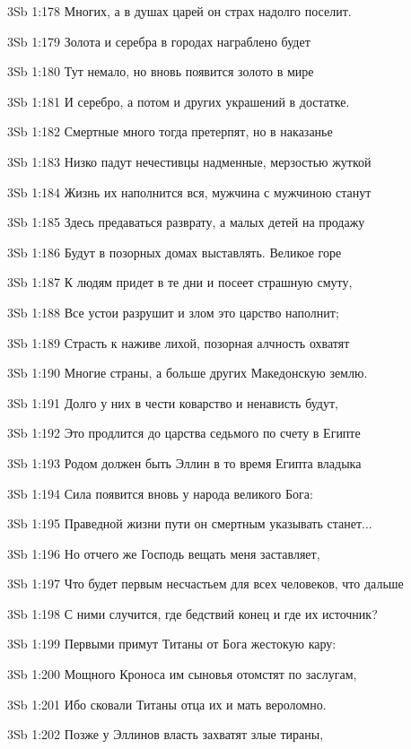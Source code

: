\vs 3Sb 1:178 Многих, а в душах царей он страх надолго поселит. 

\vs 3Sb 1:179 Золота и серебра в городах награблено будет

\vs 3Sb 1:180 Тут немало, но вновь появится золото в мире

\vs 3Sb 1:181 И серебро, а потом и других украшений в достатке. 

\vs 3Sb 1:182 Смертные много тогда претерпят, но в наказанье

\vs 3Sb 1:183 Низко падут нечестивцы надменные, мерзостью жуткой 

\vs 3Sb 1:184 Жизнь их наполнится вся, мужчина с мужчиною станут

\vs 3Sb 1:185 Здесь предаваться разврату, а малых детей на продажу 

\vs 3Sb 1:186 Будут в позорных домах выставлять. Великое горе 

\vs 3Sb 1:187 К людям придет в те дни и посеет страшную смуту, 

\vs 3Sb 1:188 Все устои разрушит и злом это царство наполнит; 

\vs 3Sb 1:189 Страсть к наживе лихой, позорная алчность охватят

\vs 3Sb 1:190 Многие страны, а больше других  Македонскую землю. 

\vs 3Sb 1:191 Долго у них в чести коварство и ненависть будут, 

\vs 3Sb 1:192 Это продлится до царства седьмого по счету в Египте  

\vs 3Sb 1:193 Родом должен быть Эллин в то время Египта владыка  

\vs 3Sb 1:194 Сила появится вновь у народа великого Бога:

\vs 3Sb 1:195 Праведной жизни пути он смертным указывать станет...

\vs 3Sb 1:196 Но отчего же Господь вещать меня заставляет,

\vs 3Sb 1:197 Что будет первым несчастьем для всех человеков, что дальше

\vs 3Sb 1:198 С ними случится, где бедствий конец и где их источник?

\vs 3Sb 1:199 Первыми примут Титаны от Бога жестокую кару: 

\vs 3Sb 1:200 Мощного Кроноса им сыновья отомстят по заслугам, 

\vs 3Sb 1:201 Ибо сковали Титаны отца их и мать вероломно. 

\vs 3Sb 1:202 Позже у Эллинов власть захватят злые тираны, 


